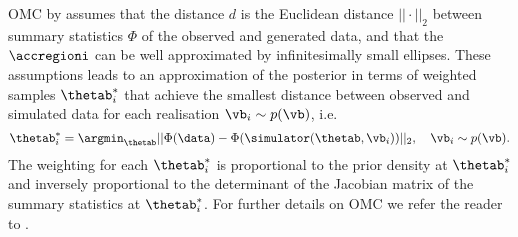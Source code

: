 OMC by \citet{Meeds2015} assumes that the distance $d$ is the
Euclidean distance $||\cdot||_2$ between summary statistics $\Phi$ of the observed
and generated data, and that the $\accregioni$ can be well
approximated by infinitesimally small ellipses. These assumptions
leads to an approximation of the posterior in terms of weighted
samples $\thetab_i^*$ that achieve the smallest distance between
observed and simulated data for each realisation $\vb_i \sim p(\vb)$,
i.e.\
\begin{equation} \label{eq:omc_opt_prob}
\thetab_i^* = \argmin_{\thetab} ||\Phi(\data)-\Phi(\simulator(\thetab, \vb_i))||_2  , \quad \vb_i \sim p(\vb).
\end{equation}
The weighting for each $\thetab_i^*$ is proportional to the prior
density at $\thetab_i^*$ and inversely proportional to the determinant
of the Jacobian matrix of the summary statistics at $\thetab_i^*$. For
further details on OMC we refer the reader to \citep{Meeds2015,
  Ikonomov2019}.

